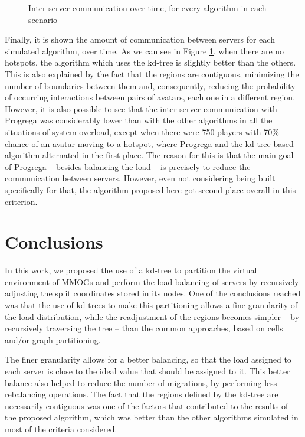 \documentclass[acmjacm]{acmtrans2m}
\begin{document}
\begin{figure}[!t]
	\caption{Inter-server communication over time, for every algorithm in each scenario}
	\label{fig:overhead}
\end{figure}

Finally, it is shown the amount of communication between servers for each simulated algorithm, over time. As we can see in Figure \ref{fig:overhead}, when there are no hotspots, the algorithm which uses the kd-tree is slightly better than the others. This is also explained by the fact that the regions are contiguous, minimizing the number of boundaries between them and, consequently, reducing the probability of occurring interactions between pairs of avatars, each one in a different region. However, it is also possible to see that the inter-server communication with Progrega was considerably lower than with the other algorithms in all the situations of system overload, except when there were 750 players with 70\% chance of an avatar moving to a hotspot, where Progrega and the kd-tree based algorithm alternated in the first place. The reason for this is that the main goal of Progrega -- besides balancing the load -- is precisely to reduce the communication between servers. However, even not considering being built specifically for that, the algorithm proposed here got second place overall in this criterion.

\section{Conclusions}
\label{sec:conc}

In this work, we proposed the use of a kd-tree to partition the virtual environment of MMOGs and perform the load balancing of servers by recursively adjusting the split coordinates stored in its nodes. One of the conclusions reached was that the use of kd-trees to make this partitioning allows a fine granularity of the load distribution, while the readjustment of the regions becomes simpler -- by recursively traversing the tree -- than the common approaches, based on cells and/or graph partitioning.

The finer granularity allows for a better balancing, so that the load assigned to each server is close to the ideal value that should be assigned to it. This better balance also helped to reduce the number of migrations, by performing less rebalancing operations. The fact that the regions defined by the kd-tree are necessarily contiguous was one of the factors that contributed to the results of the proposed algorithm, which was better than the other algorithms simulated in most of the criteria considered.
\end{document}
